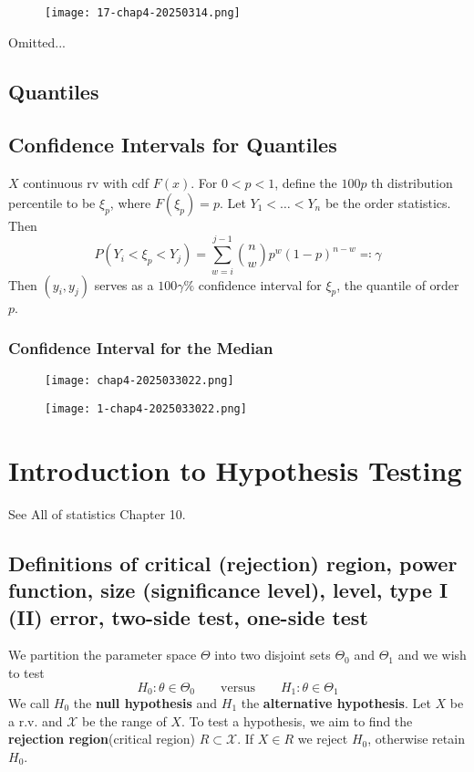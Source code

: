 \begin{figure}[H]
\centering
\texttt{[image: 17-chap4-20250314.png]}
\label{}
\end{figure}

Omitted...

\subsection{Quantiles}

\subsection{Confidence Intervals for Quantiles}

$X$ continuous rv with cdf $F(x)$. For $0<p<1$, define the $100p$ th distribution percentile to be $\xi_{p}$, where $F(\xi_{p})=p$. Let $Y_1<\dots<Y_n$ be the order statistics. Then
\[
P(Y_i<\xi_{p}<Y_j)=\sum_{w=i}^{j-1} \binom{n}{w}p^{w}(1-p)^{n-w}\eqqcolon \gamma
\]
Then $(y_i,y_j)$ serves as a $100\gamma\%$ confidence interval for $\xi_{p}$, the quantile of order $p$.

\subsubsection{Confidence Interval for the Median}

\begin{figure}[H]
\centering
\texttt{[image: chap4-2025033022.png]}
\label{}
\end{figure}
\begin{figure}[H]
\centering
\texttt{[image: 1-chap4-2025033022.png]}
\label{}
\end{figure}

\section{Introduction to Hypothesis Testing}

See All of statistics Chapter 10.

\subsection{Definitions of critical (rejection) region, power function, size (significance level), level, type I (II) error, two-side test, one-side test}

We partition the parameter space $\Theta$ into two disjoint sets $\Theta_0$ and $\Theta_1$ and we wish to test
\[
H_0:\theta\in\Theta_0\qquad \text{versus}\qquad H_1:\theta\in\Theta_1
\]
We call $H_0$ the \textbf{null hypothesis} and $H_1$ the \textbf{alternative hypothesis}. Let $X$ be a r.v. and $\mathcal{X}$ be the range of $X$. To test a hypothesis, we aim to find the \textbf{rejection region}(critical region) $R\subset \mathcal{X}$. If $X\in R$ we reject $H_0$, otherwise retain $H_0$.

